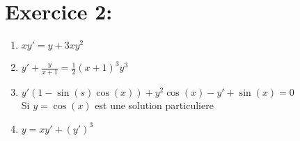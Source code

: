\documentclass[a4paper,12pt]{article}
\begin{document}
\section*{Exercice 2:}
\begin{enumerate}
	\item $xy' = y + 3xy^2$
	\item $y' + \frac{y}{x+1} = \frac{1}{2} (x+1)^3 y^3$
	\item $y' (1 -\sin(s)\cos(x)) + y^2\cos(x) -y' + \sin(x) = 0$ \\ Si $y = \cos(x)$ est une solution particuliere
	\item $y = xy' + (y')^3$
\end{enumerate}
\end{document}
